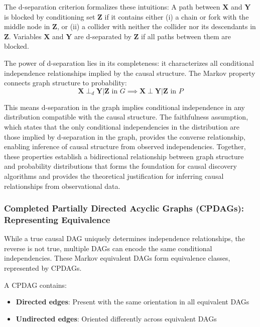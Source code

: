 The d-separation criterion formalizes these intuitions: A path between $\mathbf{X}$ and $\mathbf{Y}$ is blocked by conditioning set $\mathbf{Z}$ if it contains either (i) a chain or fork with the middle node in $\mathbf{Z}$, or (ii) a collider with neither the collider nor its descendants in $\mathbf{Z}$. Variables $\mathbf{X}$ and $\mathbf{Y}$ are d-separated by $\mathbf{Z}$ if all paths between them are blocked.

The power of d-separation lies in its completeness: it characterizes all conditional independence relationships implied by the causal structure. The Markov property connects graph structure to probability:
\begin{equation}
	\mathbf{X} \perp_d \mathbf{Y} | \mathbf{Z} \text{ in } G \implies \mathbf{X} \perp \mathbf{Y} | \mathbf{Z} \text{ in } P
\end{equation}

This means d-separation in the graph implies conditional independence in any distribution compatible with the causal structure. The faithfulness assumption, which states that the only conditional independencies in the distribution are those implied by d-separation in the graph, provides the converse relationship, enabling inference of causal structure from observed independencies. Together, these properties establish a bidirectional relationship between graph structure and probability distributions that forms the foundation for causal discovery algorithms and provides the theoretical justification for inferring causal relationships from observational data.

\subsubsection{Completed Partially Directed Acyclic Graphs (CPDAGs): Representing Equivalence}

While a true causal DAG uniquely determines independence relationships, the reverse is not true, multiple DAGs can encode the same conditional independencies. These Markov equivalent DAGs form equivalence classes, represented by CPDAGs.

A CPDAG contains:
\begin{itemize}
	\item \textbf{Directed edges}: Present with the same orientation in all equivalent DAGs
	\item \textbf{Undirected edges}: Oriented differently across equivalent DAGs
\end{itemize}

